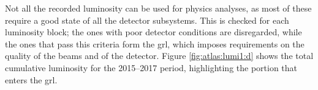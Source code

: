 Not all the recorded luminosity can be used for physics analyses, as most of these require a good state of all the detector subsystems. This is checked for each luminosity block; the ones with poor detector conditions are disregarded, while the ones that pass this criteria form the \gls{grl}, which imposes requirements on the quality of the beams and of the detector. Figure \ref{fig:atlas:lumi1:d} shows the total cumulative luminosity for the 2015--2017 period, highlighting the portion that enters the \gls{grl}. 

